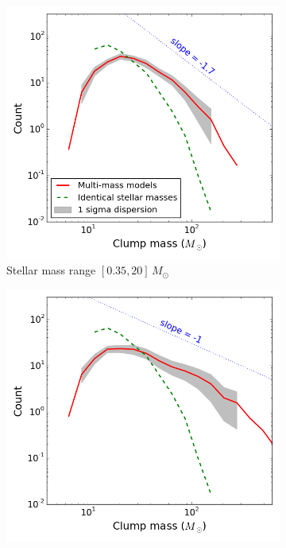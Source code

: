 \begin{figure}
\center
    \centering
    \begin{subfigure}[b]{0.49\textwidth}
    	\centering
    	\includegraphics[width=\textwidth]{Figures/2_ClumpMF_MF_1}
        \caption{Stellar mass range $[0.35, 20]\, M_\odot$ }
        \label{Fig:2_ClumpMF_MF_1}
    \end{subfigure}
    \begin{subfigure}[b]{0.49\textwidth}
    	\centering
    	\includegraphics[width=\textwidth]{Figures/2_ClumpMF_MF_2}

\end{subfigure}
\end{figure}

